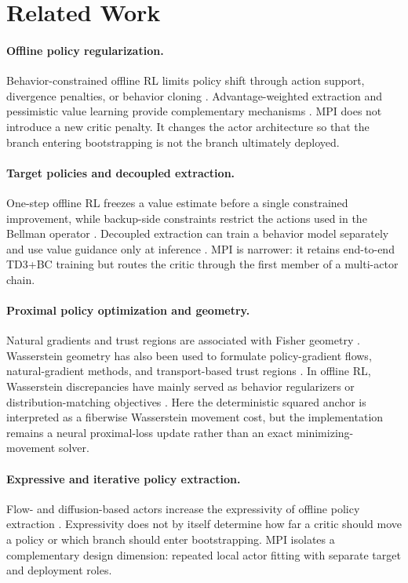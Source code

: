 \section{Related Work}
\label{sec:related}

\paragraph{Offline policy regularization.}
Behavior-constrained offline RL limits policy shift through action support, divergence penalties, or behavior cloning \citep{fujimoto2019offpolicy,kumar2019bear,wu2019brac,fujimoto2021minimalist,tarasov2023revisiting}. Advantage-weighted extraction and pessimistic value learning provide complementary mechanisms \citep{nair2020awac,kostrikov2022iql,kumar2020cql,an2021edac}. MPI does not introduce a new critic penalty. It changes the actor architecture so that the branch entering bootstrapping is not the branch ultimately deployed.

\paragraph{Target policies and decoupled extraction.}
One-step offline RL freezes a value estimate before a single constrained improvement, while backup-side constraints restrict the actions used in the Bellman operator \citep{brandfonbrener2021onestep,kumar2019bear,ghasemipour2021emaq}. Decoupled extraction can train a behavior model separately and use value guidance only at inference \citep{lin2026decoupling}. MPI is narrower: it retains end-to-end TD3+BC training but routes the critic through the first member of a multi-actor chain.

\paragraph{Proximal policy optimization and geometry.}
Natural gradients and trust regions are associated with Fisher geometry \citep{amari2000methods,schulman2015trust}. Wasserstein geometry has also been used to formulate policy-gradient flows, natural-gradient methods, and transport-based trust regions \citep{zhang2018policy,moskovitz2020efficient,terpin2022trust,song2023metric}. In offline RL, Wasserstein discrepancies have mainly served as behavior regularizers or distribution-matching objectives \citep{wu2019brac,asadulaev2024rethinking}. Here the deterministic squared anchor is interpreted as a fiberwise Wasserstein movement cost, but the implementation remains a neural proximal-loss update rather than an exact minimizing-movement solver.

\paragraph{Expressive and iterative policy extraction.}
Flow- and diffusion-based actors increase the expressivity of offline policy extraction \citep{park2025flow,wang2023diffusion}. Expressivity does not by itself determine how far a critic should move a policy or which branch should enter bootstrapping. MPI isolates a complementary design dimension: repeated local actor fitting with separate target and deployment roles.
